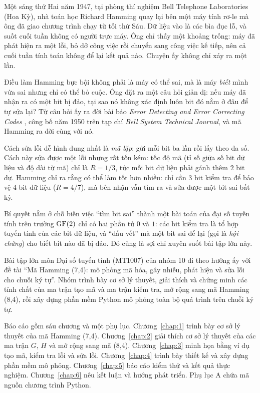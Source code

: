 
Một sáng thứ Hai năm 1947, tại phòng thí nghiệm Bell Telephone Laboratories
(Hoa Kỳ), nhà toán học Richard Hamming quay lại bên một máy tính rơ-le mà ông
đã giao chương trình chạy từ tối thứ Sáu. Dữ liệu vào là các bìa đục lỗ, và
suốt cuối tuần không có người trực máy. Ông chỉ thấy một khoảng trống: máy đã
phát hiện ra một lỗi, bỏ dở công việc rồi chuyển sang công việc kế tiếp, nên cả
cuối tuần tính toán không để lại kết quả nào. Chuyện ấy không chỉ xảy ra một
lần.

Điều làm Hamming bực bội không phải là máy có thể sai, mà là máy \emph{biết}
mình vừa sai nhưng chỉ có thể bỏ cuộc. Ông đặt ra một câu hỏi giản dị: nếu máy
đã nhận ra có một bit bị đảo, tại sao nó không xác định luôn bit đó nằm ở đâu
để tự sửa lại? Từ câu hỏi ấy ra đời bài báo \emph{Error Detecting and Error
Correcting Codes} \cite{hamming1950}, công bố năm 1950 trên tạp chí \emph{Bell
System Technical Journal}, và mã Hamming ra đời cùng với nó.

Cách sửa lỗi dễ hình dung nhất là \emph{mã lặp}: gửi mỗi bit ba lần rồi lấy
theo đa số. Cách này sửa được một lỗi nhưng rất tốn kém: tốc độ mã (tỉ số giữa
số bit dữ liệu và độ dài từ mã) chỉ là $R = 1/3$, tức mỗi bit dữ liệu phải
gánh thêm $2$ bit dư. Hamming chỉ ra rằng có thể làm tốt hơn nhiều: chỉ cần
$3$ bit kiểm tra để bảo vệ $4$ bit dữ liệu ($R = 4/7$), mà bên nhận vẫn tìm ra
và sửa được một bit sai bất kỳ.

Bí quyết nằm ở chỗ biến việc ``tìm bit sai'' thành một bài toán của đại số
tuyến tính trên trường $\mathrm{GF}(2)$ chỉ có hai phần tử $0$ và $1$: các bit kiểm tra là
tổ hợp tuyến tính của các bit dữ liệu, và ``dấu vết'' mà một bit sai để lại
(gọi là \emph{hội chứng}) cho biết bit nào đã bị đảo. Đó cũng là sợi chỉ xuyên
suốt bài tập lớn này.

Bài tập lớn môn Đại số tuyến tính (MT1007) của nhóm 10 đi theo hướng ấy với đề
tài ``Mã Hamming (7,4): mô phỏng mã hóa, gây nhiễu, phát hiện và sửa lỗi cho
chuỗi ký tự''. Nhóm trình bày cơ sở lý thuyết, giải thích và chứng minh các
tính chất của ma trận tạo mã và ma trận kiểm tra, mở rộng sang mã Hamming
(8,4), rồi xây dựng phần mềm Python mô phỏng toàn bộ quá trình trên chuỗi ký
tự.

Báo cáo gồm sáu chương và một phụ lục. Chương~\ref{chap:1} trình bày cơ sở lý
thuyết của mã Hamming (7,4). Chương~\ref{chap:2} giải thích cơ sở lý thuyết của
các ma trận $G$, $H$ và mở rộng sang mã (8,4). Chương~\ref{chap:3} minh họa
bằng ví dụ tạo mã, kiểm tra lỗi và sửa lỗi. Chương~\ref{chap:4} trình bày thiết
kế và xây dựng phần mềm mô phỏng. Chương~\ref{chap:5} báo cáo kiểm thử và kết
quả thực nghiệm. Chương~\ref{chap:6} nêu kết luận và hướng phát triển. Phụ lục A
chứa mã nguồn chương trình Python.

